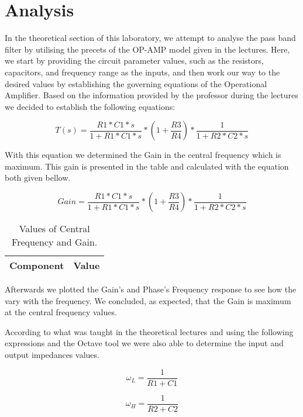 \section{Analysis}

In the theoretical section of this laboratory, we attempt to analyse the pass band filter by utilising the precets of the OP-AMP model given in the lectures.
Here, we start by providing the circuit parameter values, such as the resistors, capacitors, and frequency range as the inputs, and then work our way to the desired values by establishing the governing equations of the Operational Amplifier. Based on the information provided by the professor during the lectures we decided to establish the following equations:

\begin{equation}
T(s)= \frac{R1*C1*s}{1+R1*C1*s} * (1+\frac{R3}{R4}) * \frac{1}{1+R2*C2*s}
\end{equation}

With this equation we determined the Gain in the central frequency which is maximum. This gain is presented in the table and calculated with the equation both given bellow.

\begin{equation}
Gain= \frac{R1*C1*s}{1+R1*C1*s} * (1+\frac{R3}{R4}) * \frac{1}{1+R2*C2*s}
\end{equation}

\begin{table}[h]
  \centering
  \begin{tabular}{|l|r|}
    \hline    
    {\bf Component} & {\bf Value} \\ \hline
    
  \end{tabular}
  \caption{Values of Central Frequency and Gain.}
\end{table}

Afterwards we plotted the Gain's and Phase's Frequency response to see how the vary with the frequency. We concluded, as expected, that the Gain is maximum at the central frequency values.

According to what was taught in the theoretical lectures and using the following expressions and the Octave tool we were also able to determine the input and output impedances values.

\begin{equation}
\omega_L = \frac{1}{R1+C1}
\end{equation}

\begin{equation}
\omega_H = \frac{1}{R2+C2}
\end{equation}

